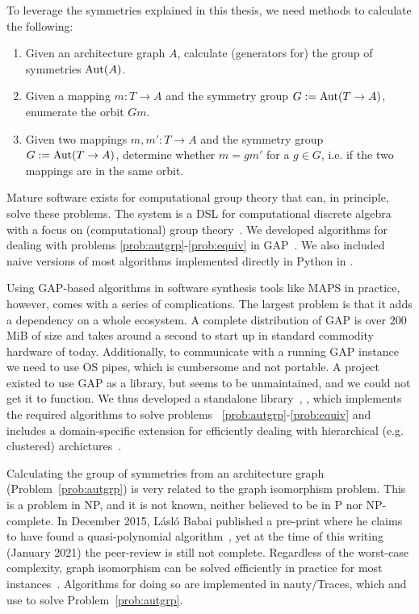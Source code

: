 To leverage the symmetries explained in this thesis, we need methods to calculate the following:
\begin{enumerate}
\item\label{prob:autgrp} Given an architecture graph $A$, calculate (generators for) the group of symmetries $\operatorname{Aut}(A)$.
\item\label{prob:orbit} Given a mapping $m : T \rightarrow A$ and the symmetry group $G := \operatorname{Aut}(T \rightarrow A)$, enumerate the orbit $Gm$.
\item\label{prob:equiv} Given two mappings $m,m' : T \rightarrow A$ and the symmetry group $G := \operatorname{Aut}(T \rightarrow A)$, determine whether $m = gm'$ for a $g \in G$, i.e. if the two mappings are in the same orbit.
\end{enumerate}

Mature software exists for computational group theory that can, in principle, solve these problems. 
The  system is a \ac{DSL} for computational discrete algebra with a focus on (computational) group theory~\cite{gap}.
We developed algorithms for dealing with problems \ref{prob:autgrp}-\ref{prob:equiv} in \ac{GAP}~\cite{goens_taco17}.
We also included naive versions of most algorithms implemented directly in Python in \mocasin.

Using \ac{GAP}-based algorithms in software synthesis tools like \ac{MAPS} in practice, however, comes with a series of complications.
The largest problem is that it adds a dependency on a whole ecosystem.
A complete distribution of \ac{GAP} is over $200$ MiB of size and takes around a second to start up in standard commodity hardware of today.
Additionally, to communicate with a running \ac{GAP} instance we need to use \ac{OS} pipes, which is cumbersome and not portable.
A project existed to use \ac{GAP} as a library, but seems to be unmaintained, and we could not get it to function.
We thus developed a standalone library~\cite{goens_tcad21,nicolai_studienarbeit}, \mpsym , which implements the required algorithms to solve problems ~\ref{prob:autgrp}-\ref{prob:equiv} and includes a domain-specific extension for efficiently dealing with hierarchical (e.g. clustered) archictures~\cite{goens_tcad21}.

Calculating the group of symmetries from an architecture graph (Problem~\ref{prob:autgrp}) is very related to the graph isomorphism problem. 
This is a problem in NP, and it is not known, neither believed to be in P nor NP-complete. 
In December 2015, L\'{a}sl\'{o} Babai published a pre-print where he claims to have found a quasi-polynomial algorithm~\cite{babai_graph_isomorphism}, 
yet at the time of this writing (January 2021) the peer-review is still not complete.
Regardless of the worst-case complexity, graph isomorphism can be solved efficiently in practice for most instances~\cite{McKay201493}.
Algorithms for doing so are implemented in nauty/Traces, which \mocasin and \mpsym use to solve Problem~\ref{prob:autgrp}.

